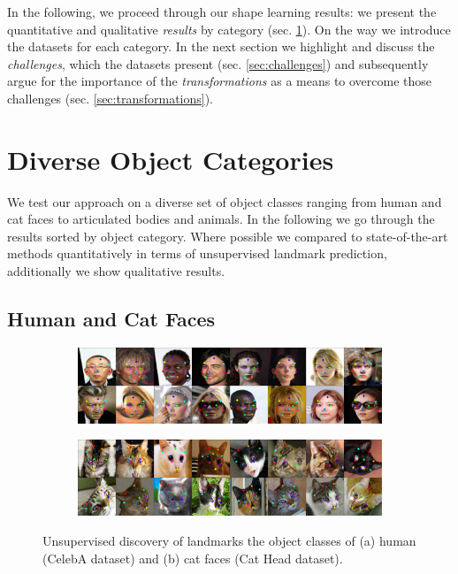 	In the following, we proceed through our shape learning results: we present the quantitative and qualitative \textit{results} by category (sec. \ref{sec:results}). On the way we introduce the datasets for each category. In the next section we highlight and discuss the \textit{challenges}, which the datasets present (sec. \ref{sec:challenges}) and subsequently argue for the importance of the \textit{transformations} as a means to overcome those challenges (sec. \ref{sec:transformations}).

\section{Diverse Object Categories}\label{sec:results}
	We test our approach on a diverse set of object classes ranging from human and cat faces to articulated bodies and animals. In the following we go through the results sorted by object category. Where possible we compared to state-of-the-art methods quantitatively in terms of unsupervised landmark prediction, additionally we show qualitative results.
	\subsection{Human and Cat Faces}\label{sec:kp_faces}
		\begin{figure}[htp]
			\centering
			\begin{subfigure}{1.\textwidth}
			\includegraphics[trim={0cm 0cm 0cm 0cm},clip, width=1.\linewidth]{fig/shape/0celeba}\caption{}
			\end{subfigure}
			\begin{subfigure}{1.\textwidth}
			\includegraphics[trim={0cm 0cm 0cm 0cm},clip, width=1.\linewidth]{fig/shape/0cats}\caption{}
			\end{subfigure}
			\caption{{Unsupervised discovery of landmarks the object classes of (a) human (CelebA dataset) and (b) cat faces (Cat Head dataset).}}
			\label{fig:kp_faces}
		\end{figure}

